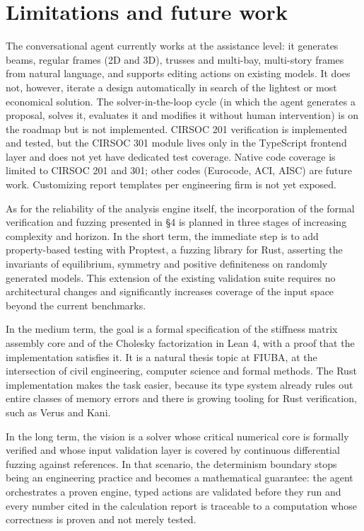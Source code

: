 \documentclass[11pt,a4paper]{article}
\begin{document}
\section{Limitations and future work}\label{sec:8}

The conversational agent currently works at the assistance level: it generates beams, regular frames (2D and 3D), trusses and multi-bay, multi-story frames from natural language, and supports editing actions on existing models. It does not, however, iterate a design automatically in search of the lightest or most economical solution. The solver-in-the-loop cycle (in which the agent generates a proposal, solves it, evaluates it and modifies it without human intervention) is on the roadmap but is not implemented. CIRSOC 201 verification is implemented and tested, but the CIRSOC 301 module lives only in the TypeScript frontend layer and does not yet have dedicated test coverage. Native code coverage is limited to CIRSOC 201 and 301; other codes (Eurocode, ACI, AISC) are future work. Customizing report templates per engineering firm is not yet exposed.

As for the reliability of the analysis engine itself, the incorporation of the formal verification and fuzzing presented in §4 is planned in three stages of increasing complexity and horizon. In the short term, the immediate step is to add property-based testing with Proptest, a fuzzing library for Rust, asserting the invariants of equilibrium, symmetry and positive definiteness on randomly generated models. This extension of the existing validation suite requires no architectural changes and significantly increases coverage of the input space beyond the current benchmarks.

In the medium term, the goal is a formal specification of the stiffness matrix assembly core and of the Cholesky factorization in Lean 4, with a proof that the implementation satisfies it. It is a natural thesis topic at FIUBA, at the intersection of civil engineering, computer science and formal methods. The Rust implementation makes the task easier, because its type system already rules out entire classes of memory errors and there is growing tooling for Rust verification, such as Verus and Kani.

In the long term, the vision is a solver whose critical numerical core is formally verified and whose input validation layer is covered by continuous differential fuzzing against references. In that scenario, the determinism boundary stops being an engineering practice and becomes a mathematical guarantee: the agent orchestrates a proven engine, typed actions are validated before they run and every number cited in the calculation report is traceable to a computation whose correctness is proven and not merely tested.
\end{document}
